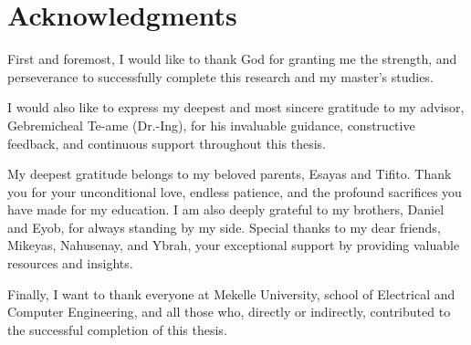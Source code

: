 \chapter*{Acknowledgments}
First and foremost, I would like to thank God for granting me the strength, and perseverance to successfully
complete this research and my master's studies. \par
I would also like to express my deepest and most sincere gratitude to my advisor, Gebremicheal Te-ame (Dr.-Ing),
for his invaluable guidance, constructive feedback, and continuous support throughout this thesis.\par
My deepest gratitude belongs to my beloved parents, Esayas and Tifito. Thank you for your unconditional love,
endless patience, and the profound sacrifices you have made for my education. I am also deeply grateful to my
brothers, Daniel and Eyob, for always standing by my side.  Special thanks to my dear friends, Mikeyas, 
Nahusenay, and Ybrah, your exceptional support by providing valuable resources and insights.\par
Finally, I want to thank everyone at Mekelle University, school of Electrical and Computer Engineering, and all those who,
directly or indirectly, contributed to the successful completion of this thesis.\par

\newpage

